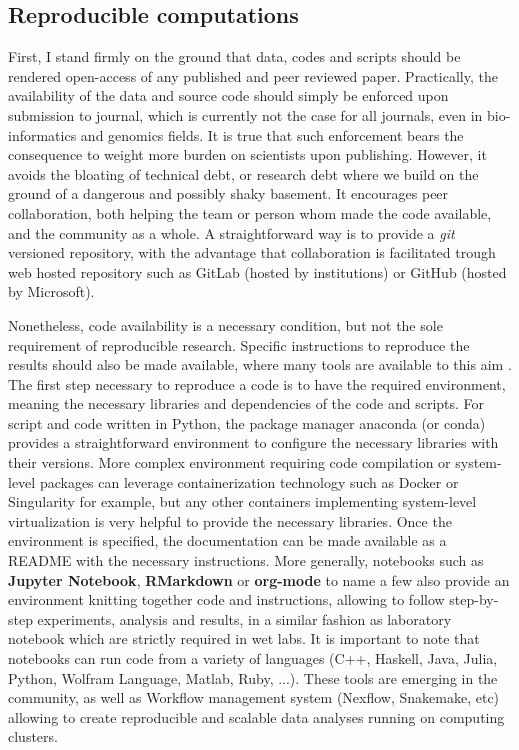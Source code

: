 \subsection{Reproducible computations}
First, I stand firmly on the ground that data, codes and scripts should be rendered open-access of any published and peer reviewed paper.
Practically, the availability of the data and source code should simply be enforced upon submission to journal, which is currently not the case for all journals, even in bio-informatics and genomics fields.
It is true that such enforcement bears the consequence to weight more burden on scientists upon publishing.
However, it avoids the bloating of technical debt, or research debt where we build on the ground of a dangerous and possibly shaky basement.
It encourages peer collaboration, both helping the team or person whom made the code available, and the community as a whole.
A straightforward way is to provide a \textit{git} versioned repository, with the advantage that collaboration is facilitated trough web hosted repository such as GitLab (hosted by institutions) or GitHub (hosted by Microsoft).

Nonetheless, code availability is a necessary condition, but not the sole requirement of reproducible research.
Specific instructions to reproduce the results should also be made available, where many tools are available to this aim \citet{Wilson2014,Darriba2018}.
The first step necessary to reproduce a code is to have the required environment, meaning the necessary libraries and dependencies of the code and scripts.
For script and code written in Python, the package manager anaconda (or conda) provides a straightforward environment to configure the necessary libraries with their versions. 
More complex environment requiring code compilation or system-level packages can leverage containerization technology such as Docker or Singularity for example, but any other containers implementing system-level virtualization is very helpful to provide the necessary libraries.
Once the environment is specified, the documentation can be made available as a README with the necessary instructions.
More generally, notebooks such as \textbf{Jupyter Notebook}, \textbf{RMarkdown} or \textbf{org-mode} to name a few also provide an environment knitting together code and instructions, allowing to follow step-by-step experiments, analysis and results, in a similar fashion as laboratory notebook which are strictly required in wet labs.
It is important to note that notebooks can run code from a variety of languages (C++, Haskell, Java, Julia, Python, Wolfram Language, Matlab, Ruby, ...).
These tools are emerging in the community, as well as Workflow management system (Nexflow, Snakemake, etc) allowing to create reproducible and scalable data analyses running on computing clusters.

